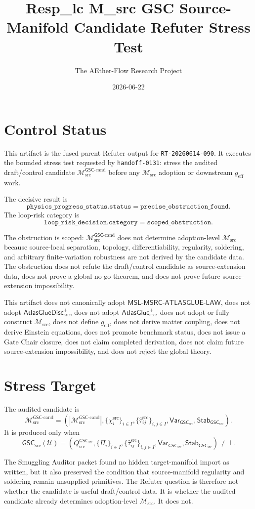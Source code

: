 \documentclass[11pt]{article}
\title{Resp\_lc M\_src GSC Source-Manifold Candidate Refuter Stress Test}
\author{The AEther-Flow Research Project}
\date{2026-06-22}
\newcommand{\Msrc}{\mathcal{M}_{\mathrm{src}}}
\newcommand{\Mgsccand}{\mathcal{M}_{\mathrm{src}}^{\mathsf{GSC}\text{-}\mathrm{cand}}}
\newcommand{\geff}{g_{\mathrm{eff}}}
\newcommand{\GSC}{\mathsf{GSC}_{\mathrm{src}}}
\newcommand{\Vargsc}{\mathsf{Var}_{\GSC}}
\newcommand{\Stabgsc}{\mathsf{Stab}_{\GSC}}
\newcommand{\Qsrc}{Q_{\mathrm{src}}^{\GSC}}
\newcommand{\Tau}{\widehat{\tau}^{\mathrm{src}}}
\newcommand{\Bot}{\bot}
\newcommand{\MSL}{\mathsf{MSL}\mbox{-}\mathsf{MSRC}\mbox{-}\mathsf{ATLASGLUE}\mbox{-}\mathsf{LAW}}
\newcommand{\AtlasGlue}{\mathsf{AtlasGlue}_{\mathrm{src}}^{+}}
\newcommand{\AtlasGlueDisc}{\mathsf{AtlasGlueDisc}_{\mathrm{src}}^{+}}
\begin{document}
\maketitle

\section*{Control Status}

This artifact is the fused parent Refuter output for
\texttt{RT-20260614-090}. It executes the bounded stress test requested by
\texttt{handoff-0131}: stress the audited draft/control candidate
\(\Mgsccand\) before any \(\Msrc\) adoption or downstream \(\geff\) work.

The decisive result is
\[
  \texttt{physics\_progress\_status.status}
  =
  \texttt{precise\_obstruction\_found}.
\]
The loop-risk category is
\[
  \texttt{loop\_risk\_decision.category}
  =
  \texttt{scoped\_obstruction}.
\]

The obstruction is scoped: \(\Mgsccand\) does not determine
adoption-level \(\Msrc\) because source-local separation, topology,
differentiability, regularity, soldering, and arbitrary finite-variation
robustness are not derived by the candidate data. The obstruction does not
refute the draft/control candidate as source-extension data, does not prove a
global no-go theorem, and does not prove future source-extension
impossibility.

This artifact does not canonically adopt \(\MSL\), does not adopt
\(\AtlasGlueDisc\), does not adopt \(\AtlasGlue\), does not adopt or fully
construct \(\Msrc\), does not define \(\geff\), does not derive matter
coupling, does not derive Einstein equations, does not promote benchmark
status, does not issue a Gate Chair closure, does not claim completed
derivation, does not claim future source-extension impossibility, and does
not reject the global theory.

\section{Stress Target}

The audited candidate is
\[
  \Mgsccand
  =
  (|\Mgsccand|,
    \{\chi_i^{\mathrm{src}}\}_{i\in I},
    \{\Tau_{ij}\}_{i,j\in I},
    \Vargsc,
    \Stabgsc).
\]
It is produced only when
\[
  \GSC(\mathcal U)
  =
  (\Qsrc,\{\Pi_i\}_{i\in I},\{\Tau_{ij}\}_{i,j\in I},
    \Vargsc,\Stabgsc)
  \neq \Bot .
\]

The Smuggling Auditor packet found no hidden target-manifold import as
written, but it also preserved the condition that source-manifold regularity
and soldering remain unsupplied primitives. The Refuter question is therefore
not whether the candidate is useful draft/control data. It is whether the
audited candidate already determines adoption-level \(\Msrc\). It does not.
\end{document}
